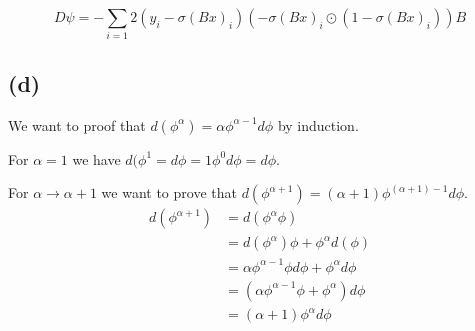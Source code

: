 \[
D\psi =     -\sum_{i=1} 2(y_i -\sigma(Bx)_i)(-\sigma(Bx)_i\odot(1-\sigma(Bx)_i))B
\]

\subsection*{(d)}

We want to proof that $d(\phi^{\alpha}) = \alpha\phi^{\alpha-1}d\phi$ by induction.

For $\alpha = 1$ we have $d(\phi^{1} = d\phi = 1 \phi^{0}d\phi = d\phi$.

For $\alpha \rightarrow \alpha +1$ we want to prove that $d(\phi^{\alpha+1}) = (\alpha+1)\phi^{(\alpha+1)-1}d\phi$.
\begin{align*}
	d(\phi^{\alpha+1}) &= d(\phi^{\alpha}\phi) \\
	&= d(\phi^{\alpha})\phi + \phi^{\alpha}d(\phi) \\
	&= \alpha\phi^{\alpha-1}\phi d\phi + \phi^{\alpha}d\phi \\
	&=(\alpha\phi^{\alpha-1}\phi+\phi^{\alpha})d\phi \\
	&=(\alpha+1)\phi^{\alpha}d\phi
\end{align*}



